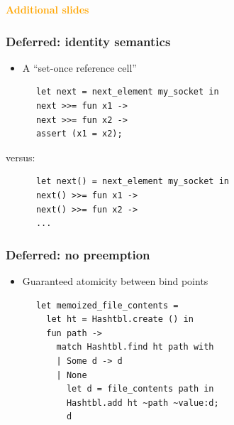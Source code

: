\documentclass{beamer}
\begin{document}

\begin{frame}[fragile]
\huge
\begin{center}
{\bf \textcolor{orange}{Additional slides}}
\end{center}
\end{frame}





\begin{frame}[fragile]
\frametitle{Deferred: identity semantics}
\begin{itemize}
\item A ``set-once reference cell''
\end{itemize}
{\footnotesize
\begin{verbatim}
      let next = next_element my_socket in
      next >>= fun x1 ->
      next >>= fun x2 ->
      assert (x1 = x2);
\end{verbatim}}
\hspace{1cm}versus:
{\footnotesize
\begin{verbatim}
      let next() = next_element my_socket in
      next() >>= fun x1 ->
      next() >>= fun x2 ->
      ...
\end{verbatim}}
\end{frame}






\begin{frame}[fragile]
\frametitle{Deferred: no preemption}
\begin{itemize}
\item Guaranteed atomicity between bind points
\end{itemize}
{\footnotesize
\begin{verbatim}
      let memoized_file_contents =
        let ht = Hashtbl.create () in
        fun path ->
          match Hashtbl.find ht path with
          | Some d -> d
          | None
            let d = file_contents path in
            Hashtbl.add ht ~path ~value:d;
            d
\end{verbatim}}
\end{frame}
\end{document}
